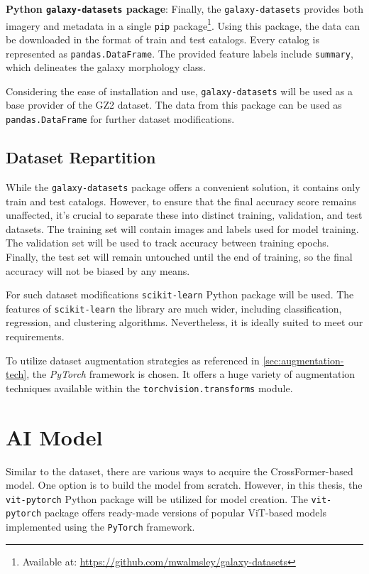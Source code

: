\medskip

\textbf{Python \texttt{galaxy-datasets} package}:
Finally, the \texttt{galaxy-datasets} provides both imagery and metadata in a single \verb|pip| package\footnote{Available at: \url{https://github.com/mwalmsley/galaxy-datasets}}. Using this package, the data can be downloaded in the format of train and test catalogs. Every catalog is represented as \texttt{pandas.DataFrame}. The provided feature labels include \texttt{summary}, which delineates the galaxy morphology class.

\medskip

Considering the ease of installation and use, \texttt{galaxy-datasets} will be used as a base provider of the GZ2 dataset. The data from this package can be used as \texttt{pandas.DataFrame} for further dataset modifications.

\subsection*{Dataset Repartition}
\label{sec:draft-dataset}

While the \texttt{galaxy-datasets} package offers a convenient solution, it contains only train and test catalogs. However, to ensure that the final accuracy score remains unaffected, it's crucial to separate these into distinct training, validation, and test datasets. The training set will contain images and labels used for model training. The validation set will be used to track accuracy between training epochs. Finally, the test set will remain untouched until the end of training, so the final accuracy will not be biased by any means.

For such dataset modifications \texttt{scikit-learn} Python package will be used. The features of \texttt{scikit-learn} the library are much wider, including classification, regression, and clustering algorithms. Nevertheless, it is ideally suited to meet our requirements.

To utilize dataset augmentation strategies as referenced in \autoref{sec:augmentation-tech}, the \textit{PyTorch} framework is chosen. It offers a huge variety of augmentation techniques available within the \texttt{torchvision.transforms} module.

\section*{AI Model}

Similar to the dataset, there are various ways to acquire the CrossFormer-based model. One option is to build the model from scratch. However, in this thesis, the \texttt{vit-pytorch} Python package will be utilized for model creation. The \texttt{vit-pytorch} package offers ready-made versions of popular ViT-based models implemented using the \texttt{PyTorch} framework.

